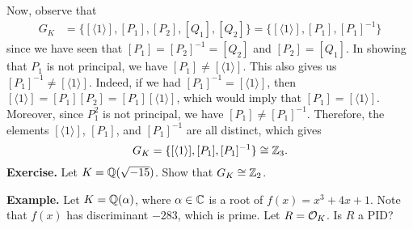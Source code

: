 Now, observe that 
\begin{align*}
    G_K &= \{[\langle 1 \rangle], [P_1], [P_2], [Q_1], [Q_2]\}  
    = \{[\langle 1 \rangle], [P_1], [P_1]^{-1}\}
\end{align*}
since we have seen that $[P_1] = [P_2]^{-1} = [Q_2]$ and $[P_2] = [Q_1]$. 
In showing that $P_1$ is not principal, we have $[P_1] 
\neq [\langle 1 \rangle]$. This also gives us $[P_1]^{-1} \neq 
[\langle 1 \rangle]$. Indeed, if we had $[P_1]^{-1} = [\langle 1 \rangle]$,
then $[\langle 1 \rangle] = [P_1][P_2] = [P_1][\langle 1 \rangle]$,
which would imply that $[P_1] = [\langle 1 \rangle]$. Moreover, 
since $P_1^2$ is not principal, we have $[P_1] \neq [P_1]^{-1}$. 
Therefore, the elements $[\langle 1 \rangle]$, $[P_1]$, and $[P_1]^{-1}$ 
are all distinct, which gives 
\[ G_K = \{[\langle 1 \rangle], [P_1], [P_1]^{-1}\} \cong \mathbb{Z}_3. \] 
{\bf Exercise.} Let $K = \mathbb{Q}(\sqrt{-15})$. Show that $G_K \cong \mathbb{Z}_2$. 

{\bf Example.} Let $K = \mathbb{Q}(\alpha)$, where $\alpha \in \mathbb{C}$ is a root of 
$f(x) = x^3 + 4x + 1$. Note that $f(x)$ has discriminant $-283$, which 
is prime. Let $R = {\cal O}_K$. Is $R$ a PID? 

